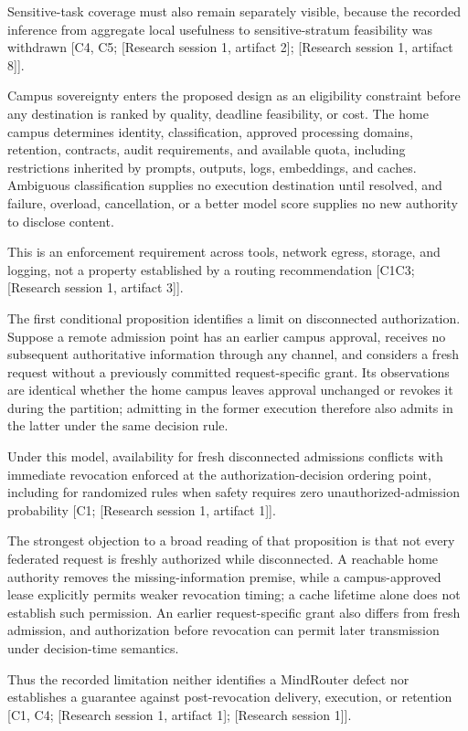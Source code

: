\documentclass[11pt]{article}
\begin{document}
Sensitive-task coverage must also remain separately visible, because the recorded inference from aggregate local usefulness to sensitive-stratum feasibility was withdrawn [C4, C5; [Research session 1, artifact 2]; [Research session 1, artifact 8]].

Campus sovereignty enters the proposed design as an eligibility constraint before any destination is ranked by quality, deadline feasibility, or cost. The home campus determines identity, classification, approved processing domains, retention, contracts, audit requirements, and available quota, including restrictions inherited by prompts, outputs, logs, embeddings, and caches. Ambiguous classification supplies no execution destination until resolved, and failure, overload, cancellation, or a better model score supplies no new authority to disclose content.

This is an enforcement requirement across tools, network egress, storage, and logging, not a property established by a routing recommendation [C1\textendash{}C3; [Research session 1, artifact 3]].

The first conditional proposition identifies a limit on disconnected authorization. Suppose a remote admission point has an earlier campus approval, receives no subsequent authoritative information through any channel, and considers a fresh request without a previously committed request-specific grant. Its observations are identical whether the home campus leaves approval unchanged or revokes it during the partition; admitting in the former execution therefore also admits in the latter under the same decision rule.

Under this model, availability for fresh disconnected admissions conflicts with immediate revocation enforced at the authorization-decision ordering point, including for randomized rules when safety requires zero unauthorized-admission probability [C1; [Research session 1, artifact 1]].

The strongest objection to a broad reading of that proposition is that not every federated request is freshly authorized while disconnected. A reachable home authority removes the missing-information premise, while a campus-approved lease explicitly permits weaker revocation timing; a cache lifetime alone does not establish such permission. An earlier request-specific grant also differs from fresh admission, and authorization before revocation can permit later transmission under decision-time semantics.

Thus the recorded limitation neither identifies a MindRouter defect nor establishes a guarantee against post-revocation delivery, execution, or retention [C1, C4; [Research session 1, artifact 1]; [Research session 1]].
\end{document}
